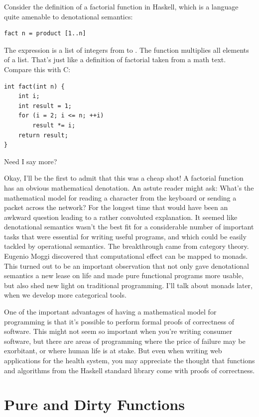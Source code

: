 Consider the definition of a factorial function in Haskell, which is a
language quite amenable to denotational semantics:

\begin{Verbatim}
fact n = product [1..n]
\end{Verbatim}
The expression \code{{[}1..n{]}} is a list of integers from  to .
The function  multiplies all elements of a list. That's
just like a definition of factorial taken from a math text. Compare this
with C:

\begin{Verbatim}
int fact(int n) {
    int i;
    int result = 1;
    for (i = 2; i <= n; ++i)
        result *= i;
    return result;
}
\end{Verbatim}
Need I say more?

Okay, I'll be the first to admit that this was a cheap shot! A factorial
function has an obvious mathematical denotation. An astute reader might
ask: What's the mathematical model for reading a character from the
keyboard or sending a packet across the network? For the longest time
that would have been an awkward question leading to a rather convoluted
explanation. It seemed like denotational semantics wasn't the best fit
for a considerable number of important tasks that were essential for
writing useful programs, and which could be easily tackled by
operational semantics. The breakthrough came from category theory.
Eugenio Moggi discovered that computational effect can be mapped to
monads. This turned out to be an important observation that not only
gave denotational semantics a new lease on life and made pure functional
programs more usable, but also shed new light on traditional
programming. I'll talk about monads later, when we develop more
categorical tools.

One of the important advantages of having a mathematical model for
programming is that it's possible to perform formal proofs of
correctness of software. This might not seem so important when you're
writing consumer software, but there are areas of programming where the
price of failure may be exorbitant, or where human life is at stake. But
even when writing web applications for the health system, you may
appreciate the thought that functions and algorithms from the Haskell
standard library come with proofs of correctness.

\section{Pure and Dirty Functions}

